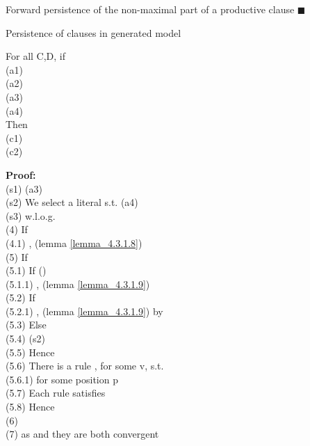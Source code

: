 \begin{lemma}{Forward persistence of the non-maximal part of a productive clause}
$\blacksquare$

\end{lemma}

\begin{lemma}{Persistence of clauses in generated model}
\label{lemma_4.3.1.14}
	
\noindent
For all C,D, if\\
(a1) \\
(a2) \\
(a3) \\
(a4) \\
Then\\
(c1) \\
(c2) 
		
		\bigskip
		\noindent
		\textbf{Proof:}\\
		(s1)  (a3)\\
		(s2) We select a literal  s.t.  (a4) \\
		(s3) w.l.o.g. \\
		(4) If \\
		\indent (4.1) , (lemma \ref{lemma_4.3.1.8})\\
		(5) If \\
		\indent (5.1) If () \\
		\indent \indent (5.1.1) , (lemma \ref{lemma_4.3.1.9})\\
		\indent (5.2) If \\
		\indent \indent (5.2.1) , (lemma \ref{lemma_4.3.1.9}) by \\
		\indent (5.3) Else \\
		\indent (5.4)  (s2)\\
		\indent (5.5) Hence \\
		\indent (5.6) There is a rule , for some v, s.t.\\
		\indent \indent (5.6.1)  for some position p\\
		\indent (5.7) Each rule  satisfies \\
		\indent (5.8) Hence \\
		(6) \\
		(7)  as  and they are both convergent\\
		\QED
\end{lemma}

